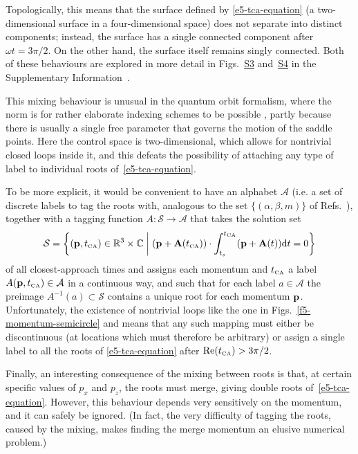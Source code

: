 Topologically, this means that the surface defined by \eqref{e5-tca-equation} (a two-dimensional surface in a four-dimensional space) does not separate into distinct components; instead, the surface has a single connected component after $\omega t=3\pi/2$. On the other hand, the surface itself remains singly connected. Both of these behaviours are explored in more detail in Figs.~\href{https://electrondynamicsincomplextimeandspace.github.io/\#figure-s3}{S3} and~\href{https://electrondynamicsincomplextimeandspace.github.io/\#figure-s4}{S4} in the Supplementary Information~\cite{SupplementaryInformation}.


This mixing behaviour is unusual in the quantum orbit formalism, where the norm is for rather elaborate indexing schemes to be possible \cite{Becker_rescattering, milosevic_ISFA-standard_2007}, partly because there is usually a single free parameter that governs the motion of the saddle points. Here the control space is two-dimensional, which allows for nontrivial closed loops inside it, and this defeats the possibility of attaching any type of label to individual roots of~\eqref{e5-tca-equation}. 


To be more explicit, it would be convenient to have an alphabet $\mathcal A$ (i.e. a set of discrete labels to tag the roots with, analogous to the set $\{(\alpha,\beta, m)\}$ of Refs.~\citealp{Becker_rescattering, milosevic_ISFA-standard_2007}), together with a tagging function $A\colon \mathcal S \to \mathcal A$ that takes the solution set
\begin{equation}
\mathcal S = \left\{ (\vb{p},{t_{\scriptscriptstyle\mathrm{CA}}})\in\mathbb{R}^3\times\mathbb{C}  
\mathrel{}\middle|\mathrel{}
(\vb{p}+\vb{A}({t_{\scriptscriptstyle\mathrm{CA}}}))\cdot\int_{{t_s}}^{{t_{\scriptscriptstyle\mathrm{CA}}}} (\vb{p}+\vb{A}(t))\mathrm{d} t=0
\right\}
\end{equation}
of all closest-approach times and assigns each momentum and ${t_{\scriptscriptstyle\mathrm{CA}}}$ a label $A(\vb{p},{t_{\scriptscriptstyle\mathrm{CA}}}) \in \mathcal A$ in a continuous way, and such that for each label $a\in\mathcal A$ the preimage $A^{-1}(a)\subset \mathcal S$ contains a unique root for each momentum $\vb{p}$. Unfortunately, the existence of nontrivial loops like the one in 
Figs.~\ref{f5-momentum-semicircle} and  means that any such mapping must either be discontinuous (at locations which must therefore be arbitrary) or assign a single label to all the roots of \eqref{e5-tca-equation} after $\Re({t_{\scriptscriptstyle\mathrm{CA}}})>3\pi/2$. 


Finally, an interesting consequence of the mixing between roots is that, at certain specific values of $p_x$ and $p_z$, the roots must merge, giving double roots of~\eqref{e5-tca-equation}. However, this behaviour depends very sensitively on the momentum, and it can safely be ignored. (In fact, the very difficulty of tagging the roots, caused by the mixing, makes finding the merge momentum an elusive numerical problem.)


